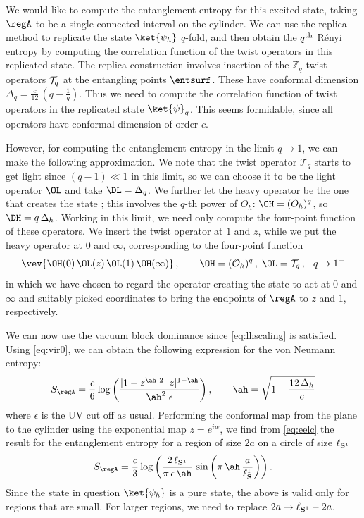 \documentclass[12pt,openany]{book}
\begin{document}
We would like to compute the entanglement entropy for this excited state, taking $\regA$ to be a single connected interval on the cylinder. We can use the replica method to replicate the  state  $\ket{\psi_h}$  $q$-fold, and then obtain the $q^{\rm th}$ R\'enyi entropy by computing  the correlation function of the twist operators in this replicated state. The replica construction involves insertion of the ${\mathbb Z}_q$ twist operators  ${\cal T}_q$ at the entangling points $\entsurf$. These have conformal dimension $\Delta_q = \frac{c}{12} \, \left(q-\frac{1}{q}\right)$. Thus we need to compute the correlation function of twist operators in the replicated state $\ket{\psi}_q$. This seems formidable, since all operators  have conformal dimension of order $c$.

However, for computing the entanglement entropy in the limit $q \to 1$, we can make the following approximation. We note that the twist operator $\mathcal{T}_q$ starts to get light since $(q-1) \ll 1$ in this limit, so we can choose it to be the light operator $\OL$ and take
$\DL = \Delta_q$.
We further let the heavy operator be the one that creates the state ; this involves the $q$-th power of $O_h$:  $\OH=(O_h)^q$, so $\DH = q\, \Delta_h$. Working in this limit, we need only compute the four-point function of these operators. We insert the twist operator at $1$ and $z$, while we put the heavy operator at $0$ and $\infty$, corresponding to the four-point function
%
\begin{equation}
\vev{ \OH(0)\, \OL(z)\, \OL(1)\, \OH(\infty)}  \,, \qquad \OH = ({\cal O}_h)^q \,, \; \OL = {\cal T}_q \,,\,\;\; q \to 1^+
\end{equation}
%
in which we have chosen to regard the operator creating the state to act at $0$ and $\infty$ and suitably picked coordinates to bring the endpoints of $\regA$ to $z$ and $1$, respectively.

We can now use the vacuum block dominance since \eqref{eq:lhscaling} is satisfied. Using \eqref{eq:vir0}, we can obtain the following expression for the von Neumann entropy:
%
\begin{equation}
S_\regA=\frac{c}{6}\log\left(\frac{|1-z^{\ah}|^2 \; |z|^{1-\ah}}{\ah^2 \;\epsilon}\right)  , \qquad \ah = \sqrt{1-\frac{12\,\Delta_h}{c} }
\label{eq:eelc}
\end{equation}
%
where $\epsilon$ is the UV cut off as usual. Performing the conformal map from the plane to the cylinder using the exponential map  $z=e^{iw}$, we find from \eqref{eq:eelc} the result for the entanglement entropy for a region of size  $2a$ on a circle of size $\ell_{{\bf S}^1}$
%
\begin{equation}
S_\regA=\frac{c}{3}\log \left(\frac{2\, \ell_{{\bf S}^1}}{\pi\, \epsilon\, \ah} \, \sin\left(\pi\,\ah\, \frac{a} {\ell_{\bf S}^1}  \right) \right).
\label{eq:eefgh}
\end{equation}
%
Since the state in question $\ket{\psi_h}$ is a pure state, the above is valid only for regions that are small. For larger regions, we need to replace $2a \to \ell_{{\bf S}^1} -2a$.
\end{document}
